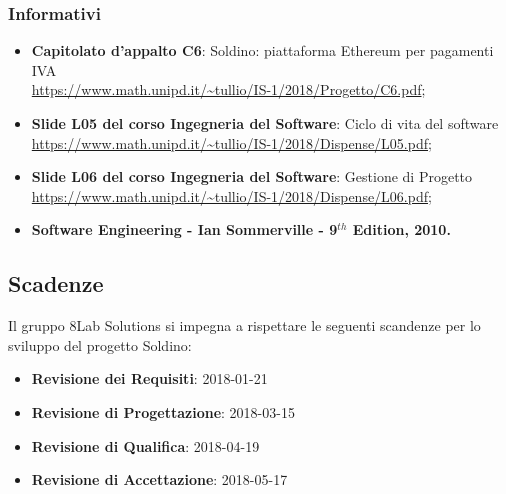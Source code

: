\subsubsection{Informativi}
\begin{itemize}
	\item \textbf{Capitolato d'appalto C6}: Soldino: piattaforma Ethereum per pagamenti IVA \\
	\url{https://www.math.unipd.it/~tullio/IS-1/2018/Progetto/C6.pdf};
	\item \textbf{Slide L05 del corso Ingegneria del Software}: Ciclo di vita 
	del software \\
	\url{https://www.math.unipd.it/~tullio/IS-1/2018/Dispense/L05.pdf};
	\item \textbf{Slide L06 del corso Ingegneria del Software}: Gestione di 
	Progetto \\
	\url{https://www.math.unipd.it/~tullio/IS-1/2018/Dispense/L06.pdf};
	\item \textbf{Software Engineering - Ian Sommerville - 9$^{th}$ Edition, 
	2010.}
\end{itemize}

\subsection{Scadenze}
Il gruppo 8Lab Solutions si impegna a rispettare le seguenti scandenze per lo 
sviluppo del progetto Soldino:

\begin{itemize}
	\item \textbf{Revisione dei Requisiti}: 2018-01-21
	\item \textbf{Revisione di Progettazione}: 2018-03-15
	\item \textbf{Revisione di Qualifica}: 2018-04-19
	\item \textbf{Revisione di Accettazione}: 2018-05-17
\end{itemize}